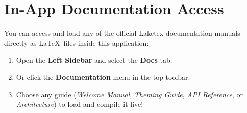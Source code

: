 \documentclass[11pt, a4paper]{article}
\begin{document}
\section{In-App Documentation Access}

You can access and load any of the official Laketex documentation manuals directly as \LaTeX\ files inside this application:
\begin{enumerate}
    \item Open the \textbf{Left Sidebar} and select the \textbf{Docs} tab.
    \item Or click the \textbf{Documentation} menu in the top toolbar.
    \item Choose any guide (\textit{Welcome Manual}, \textit{Theming Guide}, \textit{API Reference}, or \textit{Architecture}) to load and compile it live!
\end{enumerate}
\end{document}
